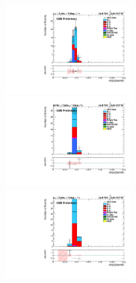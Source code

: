 \begin{figure} \label{fig-PhotonShowerShape}
\begin{center}
\includegraphics[width=0.5\textwidth]{Plots/ControlPlots/TTbarPhotonAnalysis/MuMu/Photons/SignalPhotons/Photon_sigma_ietaieta_barrel_splitTTbar_ratio.pdf}
\includegraphics[width=0.5\textwidth]{Plots/ControlPlots/TTbarPhotonAnalysis/EE/Photons/SignalPhotons/Photon_sigma_ietaieta_barrel_splitTTbar_ratio.pdf}
\includegraphics[width=0.5\textwidth]{Plots/ControlPlots/TTbarPhotonAnalysis/EMu/Photons/SignalPhotons/Photon_sigma_ietaieta_barrel_splitTTbar_ratio.pdf}
\caption{}
\end{center}
\end{figure}

